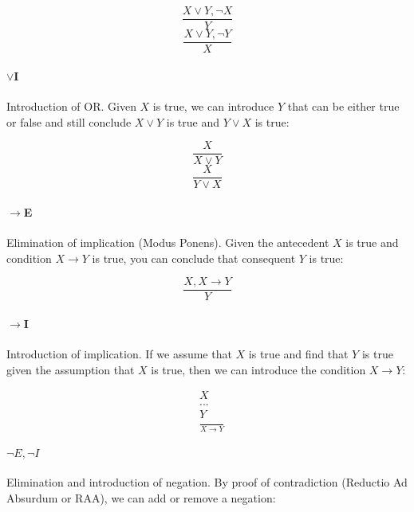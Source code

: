 \documentclass{article}
\theoremstyle{plain}
\theoremstyle{definition}
\begin{document}
\begin{multicols}{2}
\begin{multicols}{2}
\begin{equation*}  
\frac{X \lor Y, \lnot X}{Y}
\end{equation*}
\break
\begin{equation*}  
\frac{X \lor Y, \lnot Y}{X}
\end{equation*}
\end{multicols}

\paragraph{$\lor$I} Introduction of OR. Given $X$ is true, we can introduce $Y$ that can be either true or false and still conclude $X \lor Y$ is true and $Y \lor X$ is true:

\begin{multicols}{2}
\begin{equation*}  
\frac{X}{X \lor Y}
\end{equation*}
\break
\begin{equation*}  
\frac{X}{Y \lor X}
\end{equation*}
\end{multicols}

\paragraph{$\rightarrow$E} Elimination of implication (Modus Ponens). Given the antecedent $X$ is true and condition $X \rightarrow Y$ is true, you can conclude that consequent $Y$ is true:

\begin{equation*}  
\frac{X, X \rightarrow Y}{Y}
\end{equation*}

\paragraph{$\rightarrow$I} Introduction of implication. If we assume that $X$ is true and find that $Y$ is true given the assumption that $X$ is true, then we can introduce the condition $X \rightarrow Y$:

\begin{align*}
 &X \tag*{\tiny Assume}\\
 &...\\
 &Y\\
 &\frac{}{X \rightarrow Y}
\end{align*}

\paragraph{$\lnot E, \lnot I$} Elimination and introduction of negation. By proof of contradiction (Reductio Ad Absurdum or RAA), we can add or remove a negation:


\end{multicols}
\end{document}
